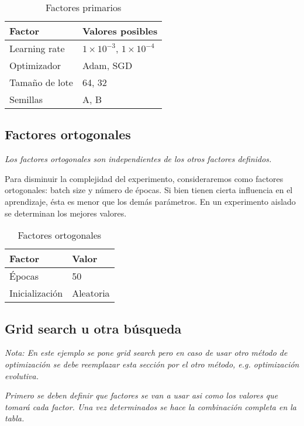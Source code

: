 \documentclass[11pt,twoside,letterpaper]{article}
\begin{document}
\begin{table}[h]
\centering
\begin{tabular}{|l|l|}
\hline
\textbf{Factor}     & \textbf{Valores posibles}   \\ \hline
Learning rate & $1 \times 10^{-3}$,  $1 \times 10^{-4}$    \\ \hline
Optimizador & Adam, SGD    \\ \hline
Tamaño de lote & 64, 32 \\ \hline
Semillas & A, B \\ \hline
\end{tabular}
\caption{Factores primarios}
\end{table}

\subsection{Factores ortogonales}

\emph{Los factores ortogonales son independientes de los otros factores definidos.}

Para disminuir la complejidad del experimento, consideraremos como factores ortogonales: batch size y número de épocas. Si bien tienen cierta influencia en el aprendizaje, ésta es menor que los demás parámetros. En un experimento aislado se determinan los mejores valores. 

\begin{table}[h]
\centering
\begin{tabular}{|l|l|}
\hline
\textbf{Factor}     & \textbf{Valor}   \\ \hline
Épocas     & 50    \\ \hline
Inicialización & Aleatoria \\ \hline
\end{tabular}
\caption{Factores ortogonales}
\end{table}

\subsection{Grid search u otra búsqueda}

\emph{Nota: En este ejemplo se pone grid search pero en caso de usar otro método de optimización se debe reemplazar esta sección por el otro método, e.g. optimización evolutiva.}

\emph{Primero se deben definir que factores se van a usar asi como los valores que tomará cada factor. Una vez determinados se hace la combinación completa en la tabla.}
\end{document}
